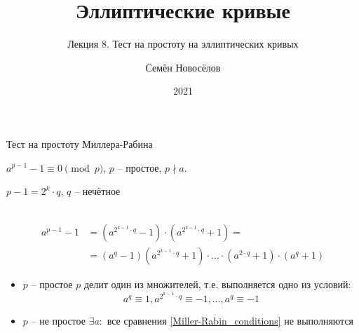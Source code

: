 \documentclass{beamer}
\title{Эллиптические кривые}
\subtitle{Лекция 8. Тест на простоту на эллиптических кривых}
\author{Семён Новосёлов}
\institute{БФУ им. И. Канта}
\date{2021}
\begin{document}
\frame{\titlepage}


\begin{frame}{Тест на простоту Миллера-Рабина}%
\begin{center}
    \begin{tcolorbox}[enhanced,hbox,colback=title-and-section-color!5,colframe=title-and-section-color!120,title=Малая теорема Ферма,center title]
        \begin{varwidth}{\textwidth}
            \begin{center}
               $a^{p-1} - 1 \equiv 0 \pmod{p}$, $p$ -- простое, $p \nmid a$. 
            \end{center}
        \end{varwidth}
    \end{tcolorbox}	
\end{center}
\begin{center}
$p-1 = 2^k \cdot q$, $q$ -- нечётное\\
\structure{$\Downarrow$}\\
\end{center}
\begin{equation*}
\begin{split}
    a^{p-1} - 1 &= (a^{2^{k-1} \cdot q} - 1) \cdot (a^{2^{k-1} \cdot q} + 1) =\\&= (a^q - 1) (a^{2^{k-1} \cdot q} + 1) \cdot \ldots \cdot (a^{2 \cdot q} + 1) \cdot (a^q + 1)
\end{split}
\end{equation*}
\begin{itemize}
    \item $p$ -- простое \structure{$\implies$} $p$ делит один из множителей, т.е. выполняется одно из условий:
    \begin{equation}
        \label{Miller-Rabin_conditions}
        a^q \equiv 1, a^{2^{k-1} \cdot q} \equiv -1, \ldots, a^{q} \equiv -1
    \end{equation}
    \item $p$ -- не простое \structure{$\implies$} $\exists a:$ все сравнения \eqref{Miller-Rabin_conditions} не выполняются
\end{itemize}
\end{frame}
\end{document}
